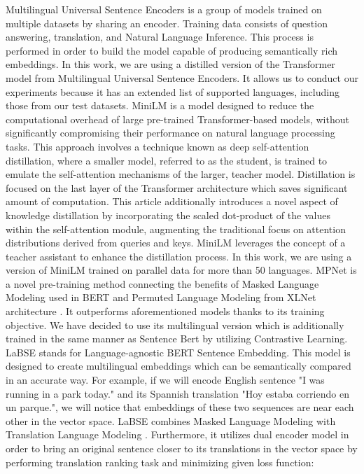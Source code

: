 \documentclass[12pt]{report}
\begin{document}
\newline \newline
Multilingual Universal Sentence Encoders \cite{universal_sentence_encoder} is a group of models trained on multiple datasets by sharing an encoder. Training data consists of question answering, translation, and Natural Language Inference. This process is performed in order to build the model capable of producing semantically rich embeddings. In this work, we are using a distilled version of the Transformer model from Multilingual Universal Sentence Encoders. It allows us to conduct our experiments because it has an extended list of supported languages, including those from our test datasets.
\newline \newline
MiniLM \cite{wang2020minilm} is a model designed to reduce the computational overhead of large pre-trained Transformer-based models, without significantly compromising their performance on natural language processing tasks. This approach involves a technique known as deep self-attention distillation, where a smaller model, referred to as the student, is trained to emulate the self-attention mechanisms of the larger, teacher model. Distillation is focused on the last layer of the Transformer architecture which saves significant amount of computation. This article additionally introduces a novel aspect of knowledge distillation by incorporating the scaled dot-product of the values within the self-attention module, augmenting the traditional focus on attention distributions derived from queries and keys. MiniLM leverages the concept of a teacher assistant to enhance the distillation process. In this work, we are using a version of MiniLM trained on parallel data for more than 50 languages.
\newline \newline
MPNet \cite{song2020mpnet} is a novel pre-training method connecting the benefits of Masked Language Modeling used in BERT \cite{devlin2019bert} and Permuted Language Modeling from XLNet architecture \cite{yang2020xlnet}. It outperforms aforementioned models thanks to its training objective. We have decided to use its multilingual version which is additionally trained in the same manner as Sentence Bert by utilizing Contrastive Learning.
\newline \newline
LaBSE \cite{labse} stands for Language-agnostic BERT Sentence Embedding. This model is designed to create multilingual embeddings which can be semantically compared in an accurate way. For example, if we will encode English sentence "I was running in a park today." and its Spannish translation "Hoy estaba corriendo en un parque.", we will notice that embeddings of these two sequences are near each other in the vector space. LaBSE combines Masked Language Modeling \cite{devlin2019bert} with Translation Language Modeling \cite{lample2019crosslingual}. Furthermore, it utilizes dual encoder model in order to bring an original sentence closer to its translations in the vector space by performing translation ranking task and minimizing given loss function:
\end{document}
